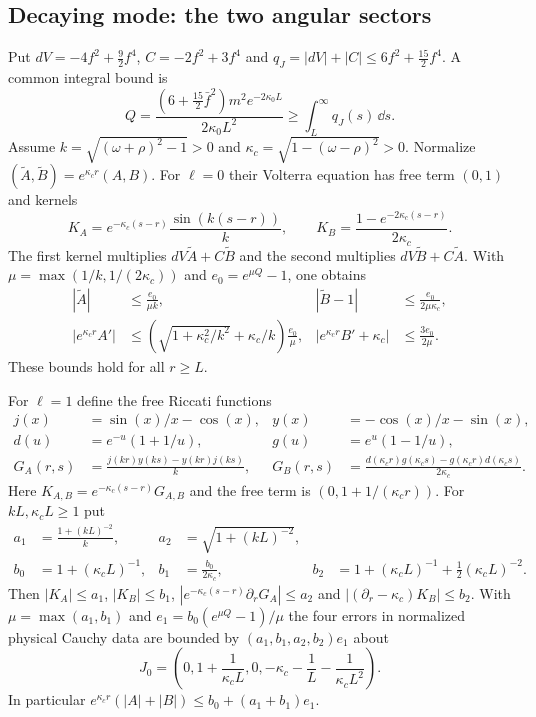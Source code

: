 \subsection{Decaying mode: the two angular sectors}
\label{supp:jost-tail}
Put $dV=-4f^2+\tfrac92 f^4$, $C=-2f^2+3f^4$ and
$q_J=|dV|+|C|\leq6f^2+\tfrac{15}{2}f^4$. A common integral bound is
\begin{equation}
 Q=\frac{(6+\tfrac{15}{2}\bar f^2)m^2e^{-2\kappa_0L}}
          {2\kappa_0L^2}\geq\int_L^\infty q_J(s)\,\dd s.
\end{equation}
Assume $k=\sqrt{(\omega+\rho)^2-1}>0$ and
$\kappa_c=\sqrt{1-(\omega-\rho)^2}>0$. Normalize
$(\widetilde A,\widetilde B)=e^{\kappa_cr}(A,B)$.
For $\ell=0$ their Volterra equation has free term $(0,1)$ and kernels
\begin{equation}
 K_A=e^{-\kappa_c(s-r)}\frac{\sin(k(s-r))}{k},\qquad
 K_B=\frac{1-e^{-2\kappa_c(s-r)}}{2\kappa_c}.
 \label{eq:proof-l0-kernels}
\end{equation}
The first kernel multiplies $dV\widetilde A+C\widetilde B$ and the
second multiplies $dV\widetilde B+C\widetilde A$.
With $\mu=\max(1/k,1/(2\kappa_c))$ and $e_0=e^{\mu Q}-1$, one obtains
\begin{align}
 |\widetilde A|&\leq\frac{e_0}{\mu k},&
 |\widetilde B-1|&\leq\frac{e_0}{2\mu\kappa_c},\nonumber\\
 |e^{\kappa_cr}A'|&\leq
  \left(\sqrt{1+\kappa_c^2/k^2}+\kappa_c/k\right)\frac{e_0}{\mu},&
 |e^{\kappa_cr}B'+\kappa_c|&\leq\frac{3e_0}{2\mu}.
 \label{supp:jost-l0-errors}
\end{align}
These bounds hold for all $r\geq L$.

For $\ell=1$ define the free Riccati functions
\begin{align}
 j(x)&=\sin(x)/x-\cos(x),& y(x)&=-\cos(x)/x-\sin(x),\nonumber\\
 d(u)&=e^{-u}(1+1/u),&g(u)&=e^u(1-1/u),\nonumber\\
 G_A(r,s)&=\frac{j(kr)y(ks)-y(kr)j(ks)}{k},&
 G_B(r,s)&=\frac{d(\kappa_cr)g(\kappa_cs)-g(\kappa_cr)d(\kappa_cs)}{2\kappa_c}.
 \label{eq:proof-l1-kernels}
\end{align}
Here $K_{A,B}=e^{-\kappa_c(s-r)}G_{A,B}$ and the free term is
$(0,1+1/(\kappa_cr))$. For $kL,\kappa_cL\geq1$ put
\begin{align}
 a_1&=\frac{1+(kL)^{-2}}{k},&a_2&=\sqrt{1+(kL)^{-2}},\nonumber\\
 b_0&=1+(\kappa_cL)^{-1},&b_1&=\frac{b_0}{2\kappa_c},&
 b_2&=1+(\kappa_cL)^{-1}+\tfrac12(\kappa_cL)^{-2}.
 \label{eq:proof-l1-majorants}
\end{align}
Then $|K_A|\leq a_1$, $|K_B|\leq b_1$,
$|e^{-\kappa_c(s-r)}\partial_rG_A|\leq a_2$ and
$|(\partial_r-\kappa_c)K_B|\leq b_2$.
With $\mu=\max(a_1,b_1)$ and $e_1=b_0(e^{\mu Q}-1)/\mu$ the four
errors in normalized physical Cauchy data are bounded by
$(a_1,b_1,a_2,b_2)e_1$ about
\begin{equation}
 J_0=\left(0,1+\frac1{\kappa_cL},0,
              -\kappa_c-\frac1L-\frac1{\kappa_cL^2}\right).
\end{equation}
In particular $e^{\kappa_cr}(|A|+|B|)\leq b_0+(a_1+b_1)e_1$.

